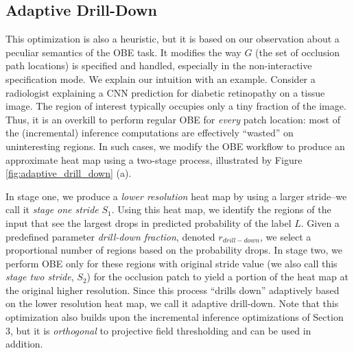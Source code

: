 \subsection{Adaptive Drill-Down}\label{sec:ada-drill-down}
This optimization is also a heuristic, but it is based on our observation about a peculiar semantics of the OBE task. It modifies the way $G$ (the set of occlusion path locations) is specified and handled, especially in the non-interactive specification mode. We explain our intuition with an example. Consider a radiologist explaining a CNN prediction for diabetic retinopathy on a tissue image. The region of interest typically occupies only a tiny fraction of the image. Thus, it is an overkill to perform regular OBE for \textit{every} patch location: most of the (incremental) inference computations are effectively ``wasted'' on uninteresting regions. In such cases, we modify the OBE workflow to produce an approximate heat map using a two-stage process, illustrated by Figure \ref{fig:adaptive_drill_down} (a).

In stage one, we produce a \textit{lower resolution} heat map by using a larger stride--we call it \textit{stage one stride} $S_1$. Using this heat map, we identify the regions of the input that see the largest drops in predicted probability of the label $L$. Given a predefined parameter \textit{drill-down fraction}, denoted $r_{drill-down}$, we select a proportional number of regions based on the probability drops. In stage two, we perform OBE only for these regions with original stride value (we also call this \textit{stage two stride}, $S_2$) for the occlusion patch to yield a portion of the heat map at the original higher resolution. Since this process ``drills down'' adaptively based on the lower resolution heat map, we call it adaptive drill-down. Note that this optimization also builds upon the incremental inference optimizations of Section 3, but it is \textit{orthogonal} to projective field thresholding and can be used in addition.


